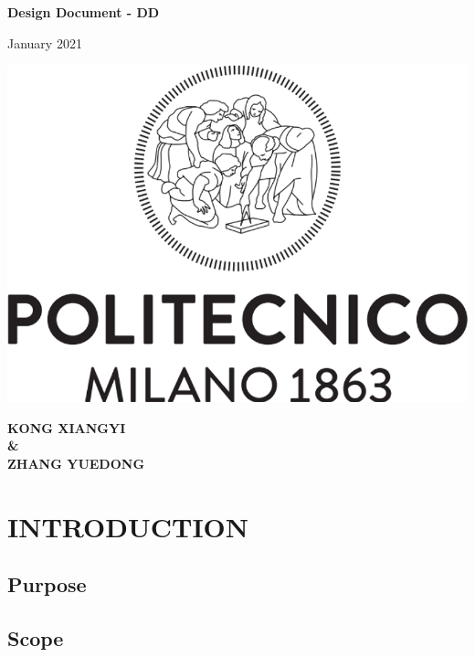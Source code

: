 \documentclass[a4paper,12pt]{report}
\begin{document}
\begin{titlepage}
	\begin{center}
		\vspace*{1cm}

		\Huge
		\textbf{Design Document - DD}

		\vspace{0.5cm}
		\large
		January 2021

		\vspace{1.5cm}


		\vfill

		\includegraphics[scale=0.7]{PolimiLogo}

		\vfill


		\normalsize
		\textbf{KONG XIANGYI} \\
		\textbf{\&} \\
		\textbf{ZHANG YUEDONG}

	\end{center}
\end{titlepage}

\tableofcontents


\chapter{INTRODUCTION}\label{ch:introduction}


\section{Purpose}


\section{Scope}
\end{document}
